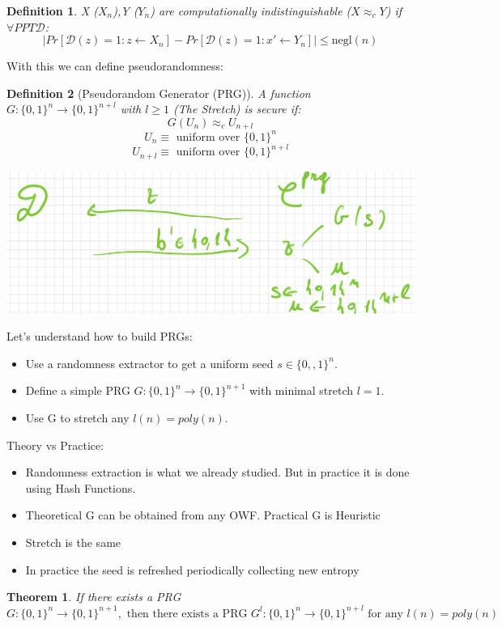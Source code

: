 \documentclass[11pt, a4paper]{article}
\newtheorem{thm}{Theorem}
\newtheorem{defn}{Definition}
\begin{document}
\begin{defn}
    X ($X_n$),Y ($Y_n$) are computationally indistinguishable ($ X \approx_c Y$) if $\forall PPT \mathcal{D}$:
    $$|Pr[\mathcal{D}(z)=1 : z \leftarrow X_n] - Pr[\mathcal{D}(z)=1 : x' \leftarrow Y_n]| \leq \text{negl}(n)$$
\end{defn}
With this we can define pseudorandomness:
\begin{defn}[Pseudorandom Generator (PRG)]
    A function $G: \{0,1\}^n \rightarrow \{0,1\}^{n+l}$ with $l \geq 1$ (The Stretch) is secure if:
    $$G(U_n) \approx_c U_{n+l}$$
    $$U_n \equiv \text{ uniform over } \{0,1\}^n$$
    $$U_{n+l} \equiv \text{ uniform over } \{0,1\}^{n+l}$$
\end{defn}
\begin{center}
    \includegraphics[scale=0.4]{img/Comp_sec/pseudogen.png}
\end{center}
Let's understand how to build PRGs:
\begin{itemize}
    \item Use a randomness extractor to get a uniform seed $s \in \{0,,1\}^n$.
    \item Define a simple PRG $G:\{0,1\}^n \rightarrow \{0,1\}^{n+1}$ with minimal stretch $l = 1$.
    \item Use G to stretch any $l(n) = poly(n)$.
\end{itemize}
Theory vs Practice:
\begin{itemize}
    \item Randomness extraction is what we already studied. But in practice it is done using Hash Functions.
    \item Theoretical G can be obtained from any OWF. Practical G is Heuristic
    \item Stretch is the same
    \item In practice the seed is refreshed periodically collecting new entropy
\end{itemize}
\begin{thm}
    If there exists a PRG $G: \{0,1\}^n \rightarrow \{0,1\}^{n+1},\text{ then there exists a PRG } G^l : \{0,1\}^n \rightarrow \{0,1\}^{n+l} \text{ for any } l(n)=poly(n) $
\end{thm}
\end{document}
